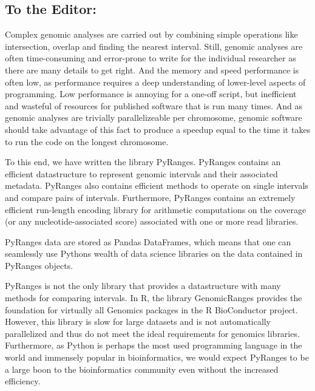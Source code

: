 \documentclass[10pt,letterpaper]{article}
\begin{document}
\subsection*{To the Editor:} Complex genomic analyses are carried out by
combining simple operations like intersection, overlap and finding the nearest
interval. Still, genomic analyses are often time-consuming and error-prone to
write for the individual researcher as there are many details to get right. And
the memory and speed performance is often low, as performance requires a deep
understanding of lower-level aspects of programming. Low performance is annoying
for a one-off script, but inefficient and wasteful of resources for published
software that is run many times. And as genomic analyses are trivially
parallelizeable per chromosome, genomic software should take advantage of this
fact to produce a speedup equal to the time it takes to run the code on the
longest chromosome.

To this end, we have written the library PyRanges. PyRanges contains an
efficient datastructure to represent genomic intervals and their associated
metadata. PyRanges also contains efficient methods to operate on single
intervals and compare pairs of intervals. Furthermore, PyRanges contains an
extremely efficient run-length encoding library for arithmetic computations on
the coverage (or any nucleotide-associated score) associated with one or more
read libraries.

PyRanges data are stored as Pandas DataFrames, which means that one can
seamlessly use Pythons wealth of data science libraries on the data contained in
PyRanges objects.

PyRanges is not the only library that provides a datastructure with many methods
for comparing intervals. In R, the library GenomicRanges provides the foundation
for virtually all Genomics packages in the R BioConductor project. However, this
library is slow for large datasets and is not automatically parallelized and
thus do not meet the ideal requirements for genomics libraries. Furthermore, as
Python is perhaps the most used programming language in the world and immensely
popular in bioinformatics, we would expect PyRanges to be a large boon to the
bioinformatics community even without the increased efficiency.










\end{document}

